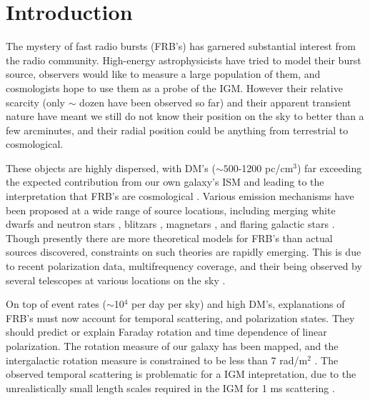 \documentclass[useAMS,usenatbib]{mn2e}
\begin{document}
\newcommand{\be}{\begin{eqnarray}}
\newcommand{\ee}{\end{eqnarray}}
\newcommand{\beq}{\begin{equation}}
\newcommand{\eeq}{\end{equation}}

\section{Introduction}
The mystery of fast radio bursts (FRB's) has garnered
substantial interest from the radio community.
High-energy astrophysicists have tried to model their burst source, 
observers would like to measure a large population of them, and cosmologists
hope to use them as a probe of the IGM. However their relative scarcity 
(only $\sim$ dozen have been observed so far) and their apparent 
transient nature have meant we still do not know their position on the sky
to better than a few arcminutes, and their radial position could be anything
from terrestrial to cosmological.

These objects are
highly dispersed, with DM's ($\sim 500$-1200 pc/cm$^3$) far exceeding
the expected contribution from our own galaxy's ISM and leading to the
interpretation that FRB's are cosmological \citep{2007Sci...318..777L, 2013Sci...341...53T}. 
Various emission mechanisms have been proposed 
at a wide range of source locations, 
including merging white dwarfs \citep{2012ApJ...760...64M}
and neutron stars \citep{2013PASJ...65L..12T},
blitzars \citep{2014A&A...562A.137F}, 
magnetars \citep{2015arXiv150101341P, 2014MNRAS.442L...9L}, 
and flaring galactic stars \citep{2014MNRAS.439L..46L}.
Though presently there are more theoretical models for FRB's than actual 
sources discovered, constraints on such theories are rapidly emerging. 
This is due to recent polarization data, 
multifrequency coverage, and their being observed by several telescopes
at various locations on the sky \citep{2014ApJ...780L...2B, 2014arXiv1412.0342P}. 

On top of event rates ($\sim$10$^4$ per day per sky) 
and high DM's, explanations of FRB's must now
account for temporal scattering, and polarization states.  They should
predict or explain Faraday rotation and time dependence of linear polarization.
The rotation measure of our galaxy has been mapped, and the
intergalactic rotation measure is constrained to be less than 7 rad/m$^2$
\citep{2015A&A...575A.118O}. 
The observed temporal scattering is problematic for a IGM intepretation, due 
to the unrealistically small length scales required in the IGM 
for 1 ms scattering \citep{2014ApJ...785L..26L}. 
\end{document}

